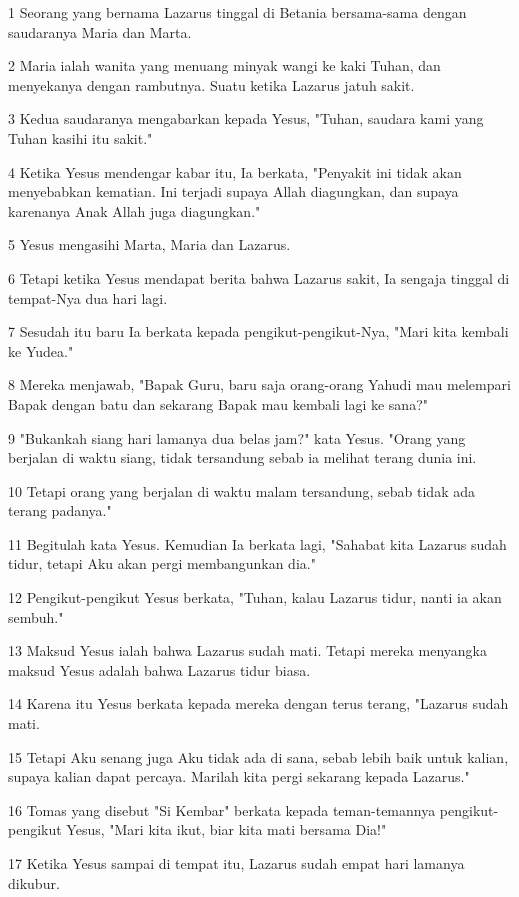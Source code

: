\par 1 Seorang yang bernama Lazarus tinggal di Betania bersama-sama dengan saudaranya Maria dan Marta.
\par 2 Maria ialah wanita yang menuang minyak wangi ke kaki Tuhan, dan menyekanya dengan rambutnya. Suatu ketika Lazarus jatuh sakit.
\par 3 Kedua saudaranya mengabarkan kepada Yesus, "Tuhan, saudara kami yang Tuhan kasihi itu sakit."
\par 4 Ketika Yesus mendengar kabar itu, Ia berkata, "Penyakit ini tidak akan menyebabkan kematian. Ini terjadi supaya Allah diagungkan, dan supaya karenanya Anak Allah juga diagungkan."
\par 5 Yesus mengasihi Marta, Maria dan Lazarus.
\par 6 Tetapi ketika Yesus mendapat berita bahwa Lazarus sakit, Ia sengaja tinggal di tempat-Nya dua hari lagi.
\par 7 Sesudah itu baru Ia berkata kepada pengikut-pengikut-Nya, "Mari kita kembali ke Yudea."
\par 8 Mereka menjawab, "Bapak Guru, baru saja orang-orang Yahudi mau melempari Bapak dengan batu dan sekarang Bapak mau kembali lagi ke sana?"
\par 9 "Bukankah siang hari lamanya dua belas jam?" kata Yesus. "Orang yang berjalan di waktu siang, tidak tersandung sebab ia melihat terang dunia ini.
\par 10 Tetapi orang yang berjalan di waktu malam tersandung, sebab tidak ada terang padanya."
\par 11 Begitulah kata Yesus. Kemudian Ia berkata lagi, "Sahabat kita Lazarus sudah tidur, tetapi Aku akan pergi membangunkan dia."
\par 12 Pengikut-pengikut Yesus berkata, "Tuhan, kalau Lazarus tidur, nanti ia akan sembuh."
\par 13 Maksud Yesus ialah bahwa Lazarus sudah mati. Tetapi mereka menyangka maksud Yesus adalah bahwa Lazarus tidur biasa.
\par 14 Karena itu Yesus berkata kepada mereka dengan terus terang, "Lazarus sudah mati.
\par 15 Tetapi Aku senang juga Aku tidak ada di sana, sebab lebih baik untuk kalian, supaya kalian dapat percaya. Marilah kita pergi sekarang kepada Lazarus."
\par 16 Tomas yang disebut "Si Kembar" berkata kepada teman-temannya pengikut-pengikut Yesus, "Mari kita ikut, biar kita mati bersama Dia!"
\par 17 Ketika Yesus sampai di tempat itu, Lazarus sudah empat hari lamanya dikubur.
